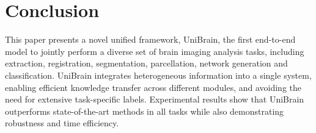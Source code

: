 \vspace{-5pt}
\section{Conclusion}
This paper presents a novel unified framework, UniBrain, the first end-to-end model to jointly perform a diverse set of brain imaging analysis tasks, including extraction, registration, segmentation, parcellation, network generation and classification. UniBrain integrates heterogeneous information into a single system, enabling efficient knowledge transfer across different modules, and avoiding the need for extensive task-specific labels. Experimental results show that UniBrain outperforms state-of-the-art methods in all tasks while also demonstrating robustness and time efficiency.
